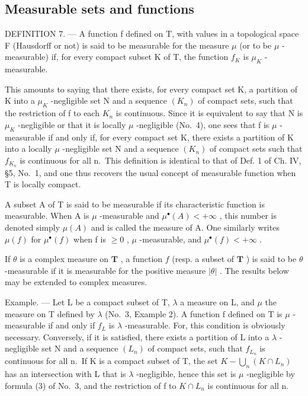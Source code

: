 \subsection{Measurable sets and functions}

DEFINITION 7. --- A function f defined on T, with values in a topological space F (Hausdorff or not) is said to be measurable for the measure \(\mu\) (or to be \(\mu\) -measurable) if, for every compact subset K of T, the function \(f_{K}\) is \(\mu_{K}\) -measurable.

This amounts to saying that there exists, for every compact set K, a partition of K into a \(\mu_{K}\) -negligible set N and a sequence \((K_{n})\) of compact sets, such that the restriction of f to each \(K_{n}\) is continuous. Since it is equivalent to say that N is \(\mu_{K}\) -negligible or that it is locally \(\mu\) -negligible (No.~4), one sees that f is \(\mu\) -measurable if and only if, for every compact set K, there exists a partition of K into a locally \(\mu\) -negligible set N and a sequence \((K_{n})\) of compact sets such that \(f_{K_{n}}\) is continuous for all n.~This definition is identical to that of Def. 1 of Ch. IV, §5, No.~1, and one thus recovers the usual concept of measurable function when T is locally compact.

A subset A of T is said to be measurable if its characteristic function is measurable. When A is \(\mu\) -measurable and \(\mu^{\bullet}(A) < +\infty\) , this number is denoted simply \(\mu(A)\) and is called the measure of A. One similarly writes \(\mu(f)\) for \(\mu^{\bullet}(f)\) when f is \(\geqslant 0\) , \(\mu\) -measurable, and \(\mu^{\bullet}(f) < +\infty\) .

If \(\theta\) is a complex measure on \(\mathbf{T}\) , a function \(f\) (resp. a subset of \(\mathbf{T}\) ) is said to be \(\theta\) -measurable if it is measurable for the positive measure \(|\theta|\) . The results below may be extended to complex measures.

Example. --- Let L be a compact subset of T, \(\lambda\) a measure on L, and \(\mu\) the measure on T defined by \(\lambda\) (No.~3, Example 2). A function f defined on T is \(\mu\) -measurable if and only if \(f_{L}\) is \(\lambda\) -measurable. For, this condition is obviously necessary. Conversely, if it is satisfied, there exists a partition of L into a \(\lambda\) -negligible set N and a sequence \((L_{n})\) of compact sets, such that \(f_{L_{n}}\) is continuous for all n.~If K is a compact subset of T, the set \(K - \bigcup_{n}(K \cap L_{n})\) has an
intersection with L that is \(\lambda\) -negligible, hence this set is \(\mu\) -negligible by formula (3) of No.~3, and the restriction of f to \(K \cap L_{n}\) is continuous for all n.

